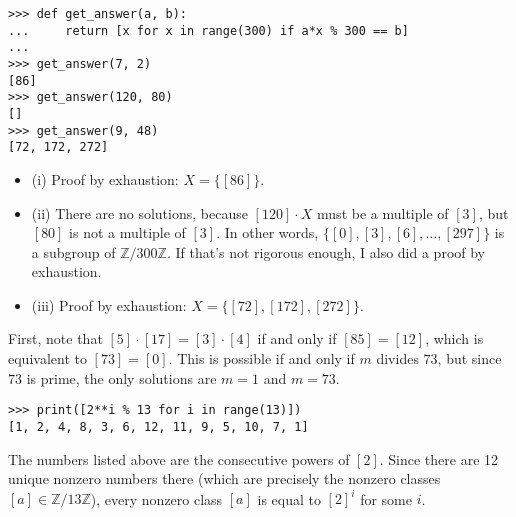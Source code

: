 \documentclass[12pt]{article}
\begin{document}
\bigskip
\noindent{}\bigskip

\begin{verbatim}
>>> def get_answer(a, b):
...     return [x for x in range(300) if a*x % 300 == b]
... 
>>> get_answer(7, 2)
[86]
>>> get_answer(120, 80)
[]
>>> get_answer(9, 48)
[72, 172, 272]
\end{verbatim}

\begin{itemize}
    \item (i) Proof by exhaustion: $X = \{ [86] \}$.
    \item (ii) There are no solutions, because $[120] \cdot X$ must be a multiple of $[3]$, but $[80]$ is not a multiple of $[3]$. In other words, $\{ [0], [3], [6], \dots, [297] \}$ is a subgroup of $\mathbb{Z}/300\mathbb{Z}$. If that's not rigorous enough, I also did a proof by exhaustion.
    \item (iii) Proof by exhaustion: $X = \{ [72], [172], [272] \}$.
\end{itemize}

\bigskip
\noindent{}\bigskip

First, note that $[5] \cdot [17] = [3] \cdot [4]$ if and only if $[85] = [12]$, which is equivalent to $[73] = [0]$. This is possible if and only if $m$ divides $73$, but since $73$ is prime, the only solutions are $m=1$ and $m=73$.

\bigskip
\noindent{}\bigskip

\begin{verbatim}
>>> print([2**i % 13 for i in range(13)])
[1, 2, 4, 8, 3, 6, 12, 11, 9, 5, 10, 7, 1]
\end{verbatim}
The numbers listed above are the consecutive powers of $[2]$. Since there are 12 unique nonzero numbers there (which are precisely the nonzero classes $[a] \in \mathbb{Z}/13\mathbb{Z}$), every nonzero class $[a]$ is equal to $[2]^i$ for some $i$.
\end{document}
